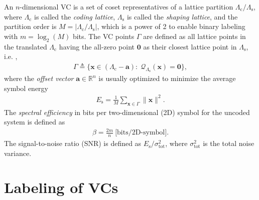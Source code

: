 \documentclass[journal]{IEEEtran}
\newcommand{\R}{\mathbb{R}}
\newcommand{\Q}{\mathcal{Q}}
\newcommand{\ba}{\boldsymbol{a}}
\newcommand{\bx}{\boldsymbol{x}}
\newcommand{\bX}{\boldsymbol{X}}
\newcommand{\bY}{\boldsymbol{Y}}
\newcommand{\bzero}{\boldsymbol{0}}
\newcommand{\Lambdas}{\Lambda_\mathrm{s}}
\newcommand{\Lambdac}{\Lambda_\mathrm{c}}
\begin{document}
An $n$-dimensional VC is a set of coset representatives of a lattice partition $\Lambda_{\text{c}}/\Lambda_{\text{s}}$, where $\Lambdac$ is called the \emph{coding lattice}, $\Lambdas$ is called the \emph{shaping lattice}, and the partition order is $M=|\Lambdac/\Lambdas|$, which is a power of 2 to enable binary labeling with $m=\log_2(M)$ bits. The VC points $\Gamma$ are defined as all lattice points in the translated $\Lambdac$ having the all-zero point $\bzero$ as their closest lattice point in $\Lambdas$, i.e. \cite{forney89b},
\begin{align}
\Gamma \triangleq \{\bx \in (\Lambdac -\ba) :\; \Q_{\Lambdas}(\bx)=\bzero \},
\label{eq:VC}
\end{align}
where the \emph{offset vector} $\ba\in \R^n$ is usually optimized to minimize the average symbol energy \cite{conway83} 
\begin{align}
E_{\text{s}}=\frac{1}{M}\sum_{\bx\in\Gamma}\|\bx\|^{2}.\label{eq:Es}
\end{align}
The \emph{spectral efficiency} \cite{forney89a, kschischang93, agrell09} in bits per two-dimensional (2D) symbol for the uncoded system is defined as 
\begin{align}
    \beta=\frac{2m}{n}~\text{[bits/2D-symbol]}.\label{eq:beta}
\end{align}
The signal-to-noise ratio (SNR) is defined as $E_{\text{s}}/\sigma_{\text{tot}}^2$, where $\sigma_{\text{tot}}^2$ is the total noise variance.






\section{Labeling of VCs}\label{sec:labeling}
\end{document}
